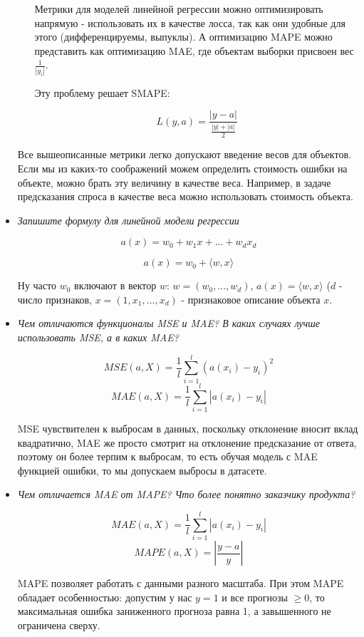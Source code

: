 \documentclass[12pt]{article}
\begin{document}
\begin{itemize}
\begin{itemize}
Метрики для моделей линейной регрессии можно оптимизировать напрямую - использовать их в качестве лосса, так как они удобные для этого (дифференцируемы, выпуклы). А оптимизацию MAPE можно представить как оптимизацию MAE, где объектам выборки присвоен вес $\frac{1}{|y_i|}$.

Эту проблему решает SMAPE:

\[ L(y, a) = \frac{|y-a|}{\frac{|y|+|a|}{2}} \]
\end{itemize}

Все вышеописанные метрики легко допускают введение весов для объектов. Если мы из каких-то соображений можем определить стоимость ошибки на объекте, можно брать эту величину в качестве веса. Например, в задаче предсказания спроса в качестве веса можно использовать стоимость объекта.

\item \textit{Запишите формулу для линейной модели регрессии}

\[ a(x) = w_0 + w_1 x + ... + w_d x_d \]

\[ a(x) = w_0 + \langle w, x \rangle \]

Ну часто $w_0$ включают в вектор $w$: $w = (w_0, ..., w_d)$, $a(x) = \langle w, x \rangle$ ($d$ - число признаков, $x = (1, x_1, ..., x_d)$ - признаковое описание объекта $x$.

\item \textit{Чем отличаются функционалы MSE и MAE? В каких случаях лучше использовать MSE, а в каких MAE?}

\[ MSE(a, X) = \frac{1}{l} \sum_{i=1}^l (a(x_i) - y_i)^2 \]
\[ MAE(a, X) = \frac{1}{l} \sum_{i=1}^l |a(x_i) - y_i | \]

MSE чувствителен к выбросам в данных, поскольку отклонение вносит вклад квадратично, MAE же просто смотрит на отклонение предсказание от ответа, поэтому он более терпим к выбросам, то есть обучая модель с MAE функцией ошибки, то мы  допускаем выбросы в датасете.

\item \textit{Чем отличается MAE от MAPE? Что более понятно заказчику продукта?}

\[ MAE(a, X) = \frac{1}{l} \sum_{i=1}^l |a(x_i) - y_i | \]
\[ MAPE(a, X) = \left| \frac{y-a}{y} \right| \]

MAPE позволяет работать с данными разного масштаба. При этом MAPE обладает особенностью: допустим у нас $y = 1$ и все прогнозы $\geq 0$, то максимальная ошибка заниженного прогноза равна 1, а завышенного не ограничена сверху.


\end{itemize}
\end{document}
